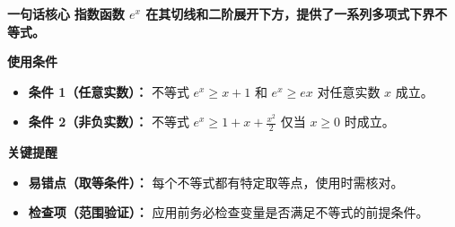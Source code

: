 \begin{summarybox}
\textbf{\textcolor{CSummary}{一句话核心}}
\textbf{指数函数 $e^x$ 在其切线和二阶展开下方，提供了一系列多项式下界不等式。}

\medskip
\textbf{\textcolor{CSummary}{使用条件}}
\begin{itemize}[leftmargin=*, itemsep=0.5em, topsep=0.4em]
    \item \textbf{条件 1（任意实数）：} 不等式 $e^x \geq x+1$ 和 $e^x \geq ex$ 对任意实数 $x$ 成立。
    \item \textbf{条件 2（非负实数）：} 不等式 $e^x \geq 1+x+\frac{x^2}{2}$ 仅当 $x \geq 0$ 时成立。
\end{itemize}

\medskip
\textbf{\textcolor{CSummary}{关键提醒}}
\begin{itemize}[leftmargin=*, itemsep=0.5em, topsep=0.4em]
    \item \textbf{易错点（取等条件）：} 每个不等式都有特定取等点，使用时需核对。
    \item \textbf{检查项（范围验证）：} 应用前务必检查变量是否满足不等式的前提条件。
\end{itemize}
\end{summarybox}
